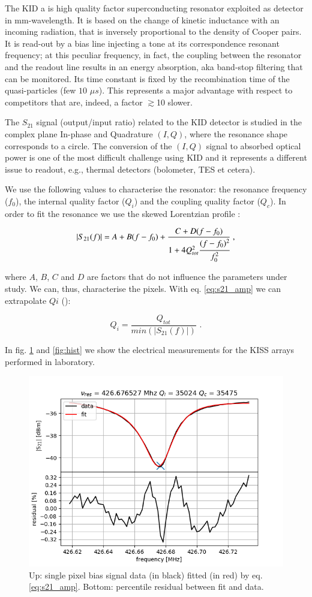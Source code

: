 \documentclass[twocolumn,traditabstract]{aa}\\
\begin{document}
The KID a is high quality factor superconducting resonator exploited as detector in mm-wavelength. It is based on the change of kinetic inductance with an incoming radiation, that is inversely proportional to the density of Cooper pairs. It is read-out by a bias line injecting a tone at its correspondence resonant frequency; at this peculiar frequency, in fact, the coupling between the resonator and the readout line results in an energy absorption, aka band-stop filtering that can be monitored. Its time constant is fixed by the recombination time of the quasi-particles (few $10$ $\mu s$). This represents a major advantage with respect to competitors that are, indeed, a factor $\gtrsim$10 slower.

The $S_{21}$ signal (output/input ratio) related to the KID detector is studied in the complex plane In-phase and Quadrature $(I,Q)$, where the resonance shape corresponds to a circle.
The conversion of the $(I,Q)$ signal to absorbed optical power is one of the most difficult challenge using KID and it represents a different issue to readout, e.g., thermal detectors (bolometer, TES et cetera).

We use the following  values to characterise the resonator: the resonance frequency ($f_0$), the internal quality factor ($Q_i$) and the coupling quality factor ($Q_c$). In order to fit the resonance we use the skewed Lorentzian profile \cite{Gao}:

\begin{equation}
\left|S_{21}(f)\right|= A+B(f-f_0)+\frac{C+D(f-f_0)}{1+4Q_{tot}^2\cfrac{(f-f_0)^2}{f_0^2}} \text{ ,}
\label{eq:s21_amp}
\end{equation}

\noindent where $A$, $B$, $C$ and $D$ are factors that do not influence the parameters under study. We can, thus, characterise the pixels. With eq. \ref{eq:s21_amp} we can extrapolate $Qi$ (\cite{Gao}):

\begin{equation}
Q_i =\frac{Q_{tot}}{min(\left|S_{21}(f)\right|)}	\text{ .}
\end{equation} 

In fig. \ref{fig:fit_amp} and \ref{fig:hist} we show the electrical measurements for the KISS arrays performed in laboratory.

\begin{figure}[htf]
	\centering
	\includegraphics[width=.5\textwidth]{3.acqui/resonance_fit.png}
	\caption{Up: single pixel bias signal data (in black) fitted (in red) by eq. \ref{eq:s21_amp}. Bottom: percentile residual between fit and data.}
	\label{fig:fit_amp}
\end{figure}
\end{document}
